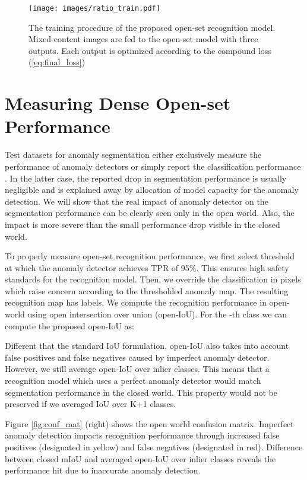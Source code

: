 \documentclass[runningheads]{llncs}
\begin{document}
\begin{figure}
    \centering
    \texttt{[image: images/ratio\_train.pdf]}
    \caption{
    The training procedure of the proposed open-set recognition model.
    Mixed-content images are fed to the open-set model with three outputs. Each output is optimized according to the compound loss (\ref{eq:final_loss})
    }
    \label{fig:ratio_train}
\end{figure}

\section{Measuring Dense Open-set Performance}
\label{sec:openiou}
Test datasets for anomaly segmentation either exclusively measure the performance of anomaly detectors \cite{pinggera16iros,chan21arxiv} or simply report the classification performance \cite{blum21ijcv}.
In the latter case, the reported drop in segmentation performance is usually negligible and is explained away by allocation of model capacity for the anomaly detection.
We will show that the real impact of anomaly detector on the segmentation performance can be clearly seen only in the open world.
Also, the impact is more severe than the small performance drop visible in the closed world.

To properly measure open-set recognition performance, we first select threshold at which the anomaly detector achieves TPR of 95\%.
This ensures high safety standards for the recognition model.
Then, we override the classification in pixels which raise concern according to the thresholded anomaly map.
The resulting recognition map has  labels.
We compute the recognition performance in open-world using open intersection over union (open-IoU).
For the -th class we can compute the proposed open-IoU as:

Different that the standard IoU formulation, open-IoU also takes into account false positives and false negatives caused by imperfect anomaly detector.
However, we still average open-IoU over  inlier classes.
This means that a recognition model which uses a perfect anomaly detector would match segmentation performance in the closed world.
This property would not be preserved if we averaged IoU over K+1 classes.

Figure \ref{fig:conf_mat} (right) shows the open world confusion matrix.
Imperfect anomaly detection impacts recognition performance through increased false positives (designated in yellow) and false negatives (designated in red).
Difference between closed mIoU and averaged open-IoU over  inlier classes reveals the performance hit due to inaccurate anomaly detection.
\end{document}
